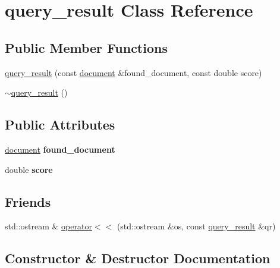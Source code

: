 \hypertarget{classquery__result}{}\section{query\+\_\+result Class Reference}
\label{classquery__result}
\subsection*{Public Member Functions}
\begin{DoxyCompactItemize}
\item 
\hyperlink{classquery__result_a957a24bae5c9fcf83099d7fa2ece2647}{query\+\_\+result} (const \hyperlink{classdocument}{document} \&found\+\_\+document, const double score)
\item 
\hyperlink{classquery__result_a85eee76ed372ad28ab7347053633714a}{$\sim$query\+\_\+result} ()
\end{DoxyCompactItemize}
\subsection*{Public Attributes}
\begin{DoxyCompactItemize}
\item 
\mbox{\label{classquery__result_a2f4b78686ff4f099b298424b9314cee4}} 
\hyperlink{classdocument}{document} {\bfseries found\+\_\+document}
\item 
\mbox{\label{classquery__result_aa385d79066a78d6b47d299ba4bf7f6e4}} 
double {\bfseries score}
\end{DoxyCompactItemize}
\subsection*{Friends}
\begin{DoxyCompactItemize}
\item 
std\+::ostream \& \hyperlink{classquery__result_aa97ddcf5d38eaf8c7160b9fe609170f5}{operator$<$$<$} (std\+::ostream \&os, const \hyperlink{classquery__result}{query\+\_\+result} \&qr)
\end{DoxyCompactItemize}


\subsection{Constructor \& Destructor Documentation}
\mbox{\label{classquery__result_a957a24bae5c9fcf83099d7fa2ece2647}} 
